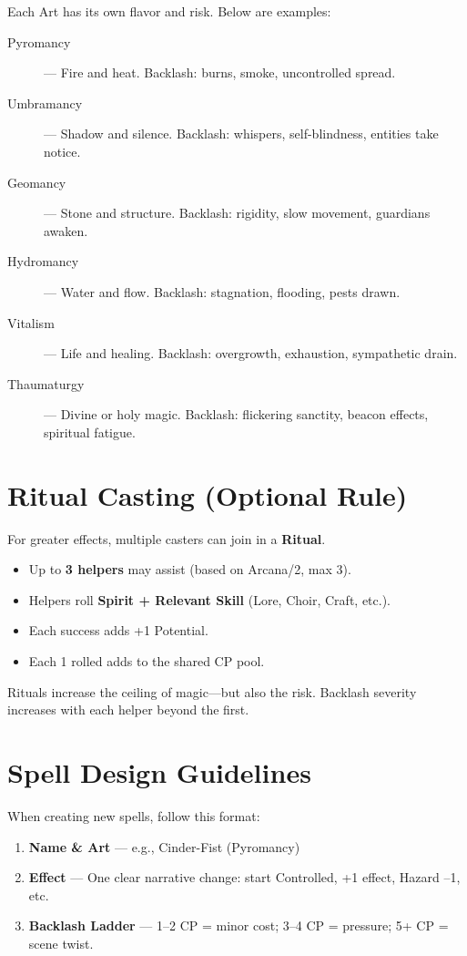 Each Art has its own flavor and risk. Below are examples:

\begin{description}
  \item[Pyromancy] — Fire and heat. Backlash: burns, smoke, uncontrolled spread.
  \item[Umbramancy] — Shadow and silence. Backlash: whispers, self-blindness, entities take notice.
  \item[Geomancy] — Stone and structure. Backlash: rigidity, slow movement, guardians awaken.
  \item[Hydromancy] — Water and flow. Backlash: stagnation, flooding, pests drawn.
  \item[Vitalism] — Life and healing. Backlash: overgrowth, exhaustion, sympathetic drain.
  \item[Thaumaturgy] — Divine or holy magic. Backlash: flickering sanctity, beacon effects, spiritual fatigue.
\end{description}

\section{Ritual Casting (Optional Rule)}

For greater effects, multiple casters can join in a \textbf{Ritual}.

\begin{itemize}
  \item Up to \textbf{3 helpers} may assist (based on Arcana/2, max 3).
  \item Helpers roll \textbf{Spirit + Relevant Skill} (Lore, Choir, Craft, etc.).
  \item Each success adds +1 Potential.
  \item Each 1 rolled adds to the shared CP pool.
\end{itemize}

Rituals increase the ceiling of magic—but also the risk. Backlash severity increases with each helper beyond the first.

\section{Spell Design Guidelines}

When creating new spells, follow this format:

\begin{enumerate}
  \item \textbf{Name \& Art} — e.g., Cinder-Fist (Pyromancy)
  \item \textbf{Effect} — One clear narrative change: start Controlled, +1 effect, Hazard –1, etc.
  \item \textbf{Backlash Ladder} — 1–2 CP = minor cost; 3–4 CP = pressure; 5+ CP = scene twist.
\end{enumerate}

